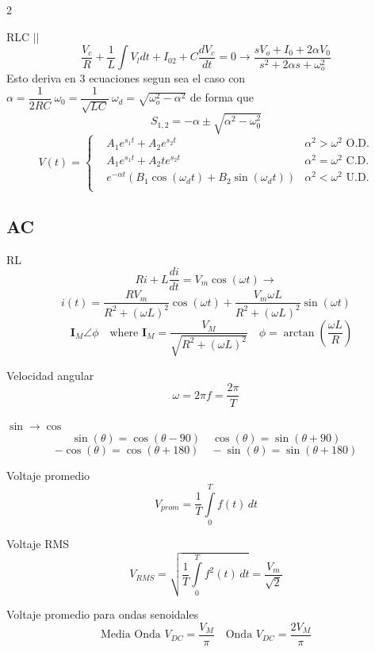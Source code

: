 \documentclass{article}
\begin{document}
\begin{multicols}{2}
\begin{itemform}
    \item RLC $||$
    $$\dfrac{V_c}{R}+\dfrac{1}{L}\int V_l dt+I_{02}+C \dfrac{dV_c}{dt}=0 \rightarrow \dfrac{sV_o+I_0+2 \alpha V_0}{s^2+2\alpha s + \omega_o^2} $$
    Esto deriva en 3 ecuaciones segun sea el caso con
    $\alpha=\dfrac{1}{2RC} \ \omega_0=\dfrac{1}{\sqrt{LC}} \ \omega_d = \sqrt{\omega_o^2-\alpha^2}$ de forma que
    $$S_{1,2}=-\alpha \pm \sqrt{\alpha^2-\omega_0^2}$$
    $$ V(t)=
    \left\{
    \begin{aligned}
    &A_1 e^{s_1 t} + A_2 e^{s_2 t}    &\alpha^2 > \omega^2 \text{ O.D.} \\
    &A_1 e^{s_1 t} + A_2 t e^{s_2 t}    &\alpha^2 = \omega^2 \text{ C.D.} \\
    &e^{-\alpha t}(B_1 \cos(\omega_d t) + B_2 \sin(\omega_d t))   &\alpha^2 < \omega^2 \text{ U.D.} \\
    \end{aligned}
    \right.
    $$
    \end{itemform}
    \subsection*{AC}
    \begin{itemform}
    \item RL
    $$Ri+L \dfrac{di}{dt}=V_m \cos (\omega t) \rightarrow $$
    $$ i(t)=\dfrac{RV_m}{R^2+(\omega L)^2} \cos(\omega t)+\dfrac{V_m \omega L}{R^2+(\omega L)^2} \sin(\omega t)$$
    $$\quad \textbf{I}_M\angle \phi \quad \text{where } \textbf{I}_M=\dfrac{V_M}{\sqrt{R^2+(\omega L)^2}} \quad \phi= \arctan{\left(\dfrac{\omega L}{R}\right)}$$
    \end{itemform}
    \begin{itemform}
    \item Velocidad angular
    $$\omega=2 \pi f=\frac{2 \pi}{T}$$
    \item $\sin\rightarrow \cos$
    $$\sin(\theta)=\cos(\theta-90 ) \quad \cos(\theta)=\sin(\theta+90)$$
    $$-\cos(\theta)=\cos(\theta+180) \quad -\sin(\theta)=\sin(\theta+180)$$



    \item Voltaje promedio
    $$V_{prom}= \dfrac{1}{T} \int\limits_0^T f(t)\,dt$$
    \item Voltaje RMS
    $$V_{RMS}=\sqrt{\dfrac{1}{T} \int\limits_0^T f^2(t)\,dt}=\dfrac{V_m}{\sqrt{2}}$$
    \item Voltaje promedio para ondas senoidales 
    $$\text{Media Onda }V_{DC}=\dfrac{V_M}{\pi} \quad \text{Onda }V_{DC}=\dfrac{2 V_M}{\pi}$$
    \end{itemform}

    \end{multicols}
\end{document}
